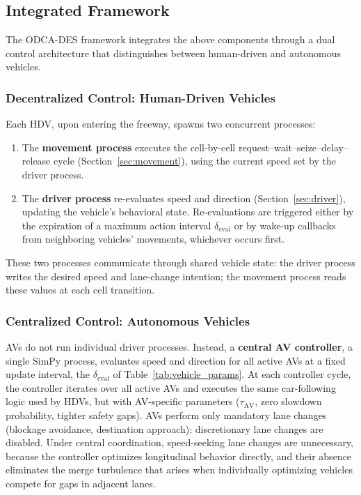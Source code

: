 \documentclass[review,number]{elsarticle}
\begin{document}
\subsection{Integrated Framework}
\label{sec:integrated}

The ODCA-DES framework integrates the above components through a dual control architecture that distinguishes between human-driven and autonomous vehicles.

\subsubsection{Decentralized Control: Human-Driven Vehicles}

Each HDV, upon entering the freeway, spawns two concurrent processes:

\begin{enumerate}
    \item The \textbf{movement process} executes the cell-by-cell request--wait--seize--delay--release cycle (Section~\ref{sec:movement}), using the current speed set by the driver process.

    \item The \textbf{driver process} re-evaluates speed and direction (Section~\ref{sec:driver}), updating the vehicle's behavioral state. Re-evaluations are triggered either by the expiration of a maximum action interval $\delta_{\text{eval}}$ or by wake-up callbacks from neighboring vehicles' movements, whichever occurs first.
\end{enumerate}

These two processes communicate through shared vehicle state: the driver process writes the desired speed and lane-change intention; the movement process reads these values at each cell transition.

\subsubsection{Centralized Control: Autonomous Vehicles}
\label{sec:av_controller}

AVs do not run individual driver processes. Instead, a \textbf{central AV controller}, a single SimPy process, evaluates speed and direction for all active AVs at a fixed update interval, the $\delta_{\text{eval}}$ of Table~\ref{tab:vehicle_params}. At each controller cycle, the controller iterates over all active AVs and executes the same car-following logic used by HDVs, but with AV-specific parameters ($\tau_{\text{AV}}$, zero slowdown probability, tighter safety gaps). AVs perform only mandatory lane changes (blockage avoidance, destination approach); discretionary lane changes are disabled. Under central coordination, speed-seeking lane changes are unnecessary, because the controller optimizes longitudinal behavior directly, and their absence eliminates the merge turbulence that arises when individually optimizing vehicles compete for gaps in adjacent lanes.
\end{document}
